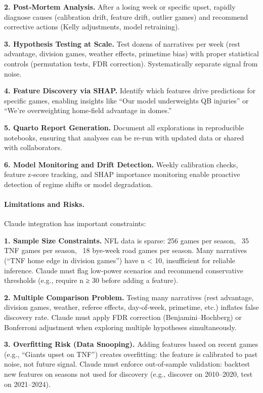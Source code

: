 \textbf{2. Post‑Mortem Analysis.} After a losing week or specific upset, rapidly diagnose causes (calibration drift, feature drift, outlier games) and recommend corrective actions (Kelly adjustments, model retraining).

\textbf{3. Hypothesis Testing at Scale.} Test dozens of narratives per week (rest advantage, division games, weather effects, primetime bias) with proper statistical controls (permutation tests, FDR correction). Systematically separate signal from noise.

\textbf{4. Feature Discovery via SHAP.} Identify which features drive predictions for specific games, enabling insights like ``Our model underweights QB injuries'' or ``We're overweighting home‑field advantage in domes.''

\textbf{5. Quarto Report Generation.} Document all explorations in reproducible notebooks, ensuring that analyses can be re‑run with updated data or shared with collaborators.

\textbf{6. Model Monitoring and Drift Detection.} Weekly calibration checks, feature z‑score tracking, and SHAP importance monitoring enable proactive detection of regime shifts or model degradation.

\paragraph{Limitations and Risks.}
Claude integration has important constraints:

\textbf{1. Sample Size Constraints.} NFL data is sparse: 256 games per season, ~35 TNF games per season, ~18 bye‑week road games per season. Many narratives (``TNF home edge in division games'') have n < 10, insufficient for reliable inference. Claude must flag low‑power scenarios and recommend conservative thresholds (e.g., require n ≥ 30 before adding a feature).

\textbf{2. Multiple Comparison Problem.} Testing many narratives (rest advantage, division games, weather, referee effects, day‑of‑week, primetime, etc.) inflates false discovery rate. Claude must apply FDR correction (Benjamini--Hochberg) or Bonferroni adjustment when exploring multiple hypotheses simultaneously.

\textbf{3. Overfitting Risk (Data Snooping).} Adding features based on recent games (e.g., ``Giants upset on TNF'') creates overfitting: the feature is calibrated to past noise, not future signal. Claude must enforce out‑of‑sample validation: backtest new features on seasons not used for discovery (e.g., discover on 2010--2020, test on 2021--2024).

